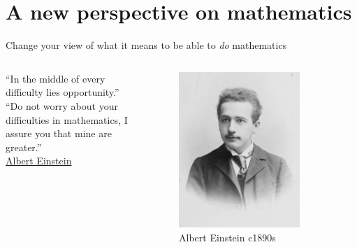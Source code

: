 \documentclass[onlytextwidth]{beamer}
\begin{document}
\section{A new perspective on mathematics}
\begin{frame}{Change your view of what it means to be able to \emph{do} mathematics}
      \begin{columns}[T]
        \begin{column}{0.5\textwidth}
          \begin{block}{}\vspace{0.5cm}
            ``In the middle of every difficulty lies opportunity.'' \\[0.5cm]
            ``Do not worry about your difficulties in mathematics, I assure you that mine are greater.'' \\[0.5cm]
            \href{https://yourstory.com/2023/04/embrace-adversity-unlock-opportunities}{Albert Einstein}
          \end{block}
        \end{column}
        \begin{column}{0.5\textwidth}
          \begin{figure}
            \centering
            \includegraphics[width=0.8\textwidth]{../graphics/Albert_Einstein_c1890s.jpg}
            \caption{Albert Einstein c1890s}
          \end{figure}
        \end{column}
      \end{columns}
    \end{frame}

  
\end{document}
